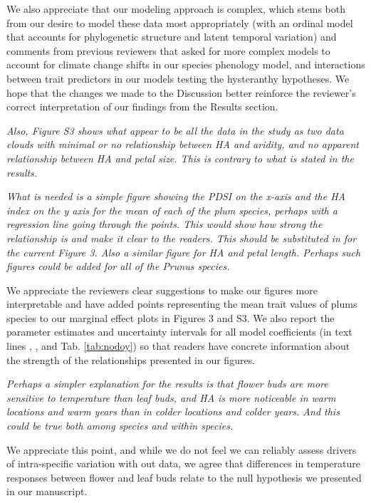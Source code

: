 \documentclass{article}[12pt]
\begin{document}
We also appreciate that our modeling approach is complex, which stems both from our desire to model these data most appropriately (with an ordinal model that accounts for phylogenetic structure and latent temporal variation) and comments from previous reviewers that asked for more complex models to account for climate change shifts in our species phenology model, and interactions between trait predictors in our models testing the hysteranthy hypotheses. We hope that the changes we made to the Discussion better reinforce the reviewer's correct interpretation of our findings from the Results section.

\emph{Also, Figure S3 shows what appear to be all the data in the study as two data clouds with minimal or no relationship between HA and aridity, and no apparent relationship between HA and petal size.  This is contrary to what is stated in the results.}

\emph{What is needed is a simple figure showing the PDSI on the x-axis and the HA index on the y axis for the mean of each of the plum species, perhaps with a regression line going through the points. This would show how strong the relationship is and make it clear to the readers. This should be substituted in for the current Figure 3.  Also a similar figure for HA and petal length. Perhaps such figures could be added for all of the Prunus species.}

We appreciate the reviewers clear suggestions to make our figures more interpretable and have added points representing the mean trait values of plums species to our marginal effect plots in Figures 3 and S3. We also report the parameter estimates and uncertainty intervals for all model coefficients (in text lines , , and Tab. \ref{tab:nodoy}) so that readers have concrete information about the strength of the relationships presented in our figures.


\emph{Perhaps a simpler explanation for the results is that flower buds are more sensitive to temperature than leaf buds, and HA is more noticeable in warm locations and warm years than in colder locations and colder years. And this could be true both among species and within species.}

We appreciate this point, and while we do not feel we can reliably assess drivers of intra-specific variation with out data, we agree that differences in temperature responses between flower and leaf buds relate to the null hypothesis we presented in our manuscript.
\end{document}
